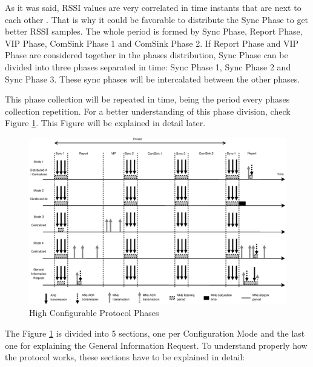 As it was said, \ac{RSSI} values are very correlated in time instants that are next to each other \cite{RSSIcorrelated}. That is why it could 
be favorable to distribute the Sync Phase to get better \ac{RSSI} samples. The whole period is formed by Sync Phase, Report Phase, \ac{VIP}
Phase, ComSink Phase 1 and ComSink Phase 2. If Report Phase and \ac{VIP} Phase are considered together in the phases distribution, Sync 
Phase can be divided into three phases separated in time: Sync Phase 1, Sync Phase 2 and Sync Phase 3. These sync phases will be intercalated 
between the other phases.

This phase collection will be repeated in time, being the period every phases collection repe\-ti\-tion. For a better understanding of this 
phase division, check Figure \ref{fig:ProtocolPhases}. This Figure will be explained in detail later.

\begin{figure}[ht]
 \begin{center}
  \includegraphics[width=1\textwidth]{ProtocolPhases.eps}
 \end{center}
 \caption{High Configurable Protocol Phases \cite{mipaper}}
 \label{fig:ProtocolPhases}
\end{figure}

The Figure \ref{fig:ProtocolPhases} is divided into 5 sections, one per Configuration Mode and the last one for explaining the General Information
Request. To understand properly how the protocol works, these sections have to be explained in detail:

